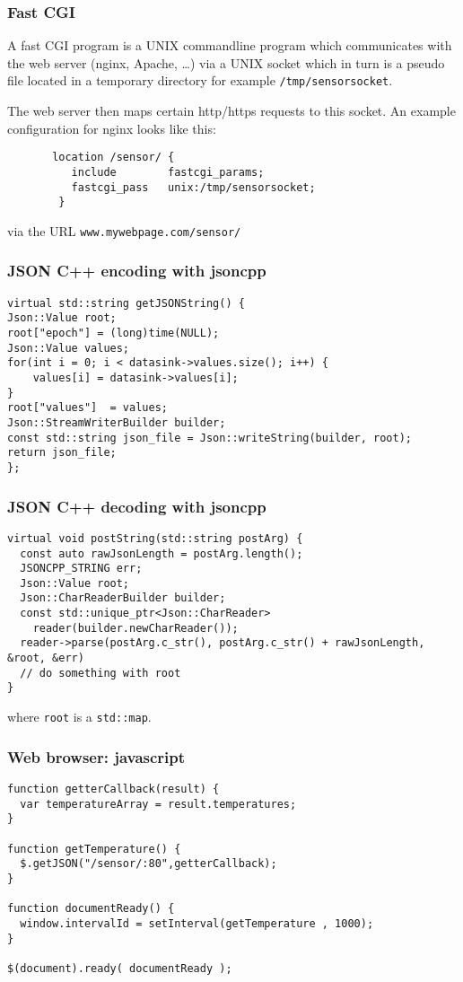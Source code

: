 \documentclass[xcolor=dvipsnames]{beamer}
\begin{document}
\begin{frame}[fragile]
  \frametitle{Fast CGI}
A fast CGI program is a UNIX commandline program which communicates with the web server
(nginx, Apache, \ldots) via a UNIX socket which in turn is a pseudo file located
in a temporary directory for example \texttt{/tmp/sensorsocket}.

The web server then maps certain http/https requests to
this socket. An example configuration for nginx looks like this:
\begin{verbatim}
       location /sensor/ {
          include        fastcgi_params;
          fastcgi_pass   unix:/tmp/sensorsocket;
        }
\end{verbatim}
via the URL \texttt{www.mywebpage.com/sensor/}
\end{frame}


\begin{frame}[fragile]
  \frametitle{JSON C++ encoding with jsoncpp}
\begin{verbatim}
virtual std::string getJSONString() {
Json::Value root;
root["epoch"] = (long)time(NULL);
Json::Value values;
for(int i = 0; i < datasink->values.size(); i++) {
    values[i] = datasink->values[i];
}
root["values"]  = values;
Json::StreamWriterBuilder builder;
const std::string json_file = Json::writeString(builder, root);
return json_file;
};
\end{verbatim}
\end{frame}


\begin{frame}[fragile]
  \frametitle{JSON C++ decoding with jsoncpp}
  \begin{verbatim}
virtual void postString(std::string postArg) {
  const auto rawJsonLength = postArg.length();
  JSONCPP_STRING err;
  Json::Value root;
  Json::CharReaderBuilder builder;
  const std::unique_ptr<Json::CharReader>
    reader(builder.newCharReader());
  reader->parse(postArg.c_str(), postArg.c_str() + rawJsonLength, &root, &err)
  // do something with root
}
\end{verbatim}
  where \texttt{root} is a \texttt{std::map}.
\end{frame}


\begin{frame}[fragile]
  \frametitle{Web browser: javascript}

  \begin{verbatim}
function getterCallback(result) {
  var temperatureArray = result.temperatures;
}

function getTemperature() {
  $.getJSON("/sensor/:80",getterCallback);
}

function documentReady() {
  window.intervalId = setInterval(getTemperature , 1000);
}

$(document).ready( documentReady );
\end{verbatim}
\end{frame}
\end{document}
